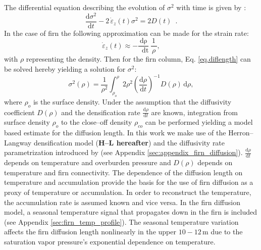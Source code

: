 \documentclass[11pt, draftcls, onecolumn]{IEEEtran} %
\numberwithin{equation}{section}
\numberwithin{table}{section}
\numberwithin{figure}{section}
\begin{document}
The differential equation describing the evolution of $\sigma^2$ with time is 
given by \citep{Johnsen1977}: 
\begin{equation}
\frac{\mathrm{d}\sigma^2}{\mathrm{d}t} - 2\,\dot{\varepsilon}_z\!\left( t \right) \sigma^2 = 
2D\!\left( t \right) \enspace .
\label{eq.diflength}
\end{equation}
In the case of firn the following approximation can be made for the strain rate:
\begin{equation}
\dot{\varepsilon}_z \left(
	t \right) \approx -\frac{\mathrm{d\rho}}{\,\,\,\mathrm{d t}}\,\frac{\,1\,}{\,\rho\,},
\label{eq.strainrate}
\end{equation}
with $\rho$ representing the density.
Then for the firn column, Eq. \ref{eq.diflength} can be solved hereby yielding a solution for $\sigma^2$:
\begin{equation}
\sigma^2 \left( \rho \right) = \frac{\,1\,}{\rho^2}\int_{\rho_o}^{\rho}2\rho^2 
{\left( \frac{\mathrm{d}\rho}{\mathrm{d}t}\right)}^{-1}\! D \!\left( \rho \right) \,\mathrm{d}\rho , 
\label{eq.difflengthintegration}
\end{equation}
where  $\rho_o$ is the surface density. 
Under the assumption that the diffusivity coefficient $D\left(\rho\right)$ and the
densification rate   $\frac{\mathrm{d}\rho}{\mathrm{d}t}$ are known,
integration from surface density $\rho_o$ to the close--off density $\rho_{co}$
can be performed yielding a model based estimate for the diffusion length.
In this work we make use of the Herron--Langway densification model (\textbf{H--L hereafter})
and the diffusivity rate parametrization introduced by \cite{Johnsen2000} (see Appendix \ref{sec:appendix_firn_diffusion}).
$\frac{\mathrm{d}\rho}{\mathrm{d}t}$ depends on temperature and overburden pressure
and $D\left(\rho\right)$ depends on temperature and firn connectivity.
The dependence of the diffusion length on temperature
and accumulation provide the basis for the use of firn diffusion as a proxy of temperature 
or accumulation. In order to reconstruct the temperature, the accumulation rate is assumed
known and vice versa.
In the firn diffusion model, a seasonal temperature signal that propagates down in the firn is included (see Appendix \ref{sec:firn_temp_profile}).
The seasonal temperature variation affects the firn diffusion length nonlinearly in the upper $10-12 \, \mathrm{m}$ due to the saturation vapor pressure's exponential
dependence on temperature.
\end{document}
